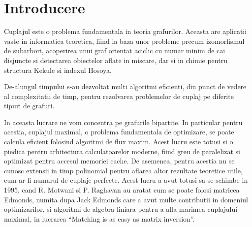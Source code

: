 \chapter{Introducere}

Cuplajul este o problema fundamentala in teoria grafurilor. Aceasta are
aplicatii vaste in informatica teoretica, fiind la baza unor probleme precum
izomorfismul de subarbori, acoperirea unui graf orientat aciclic cu numar minim
de cai disjuncte si detectarea obiectelor aflate in miscare, dar si in chimie
pentru structura Kekule si indexul Hosoya. \par %

De-alungul timpului s-au dezvoltat multi algoritmi eficienti, din punct de
vedere al complexitatii de timp, pentru rezolvarea problemelor de cuplaj pe
diferite tipuri de grafuri. \par

In aceasta lucrare ne vom concentra pe grafurile bipartite. In particular pentru
acestia, cuplajul maximal, o problema fundamentala de optimizare, se poate
calcula eficient folosind algoritmi de flux maxim. Acest lucru este totusi si o
piedica pentru arhitectura calculatoarelor moderne, fiind greu de paralelizat si
optimizat pentru accesul memoriei cache. De asemenea, pentru acestia nu se
cunosc extensii in timp polinomial pentru aflarea altor rezultate teoretice
utile, cum ar fi numarul de cuplaje perfecte. Acest lucru a avut totusi sa se
schimbe in 1995, cand R. Motwani si P. Raghavan au aratat cum se poate folosi
matricea Edmonds, numita dupa Jack Edmonds care a avut multe contributii in
domeniul optimizarilor, si algoritmi de algebra liniara pentru a afla marimea
cuplajului maximal, in lucrarea ``Matching is as easy as matrix inversion''. \par
